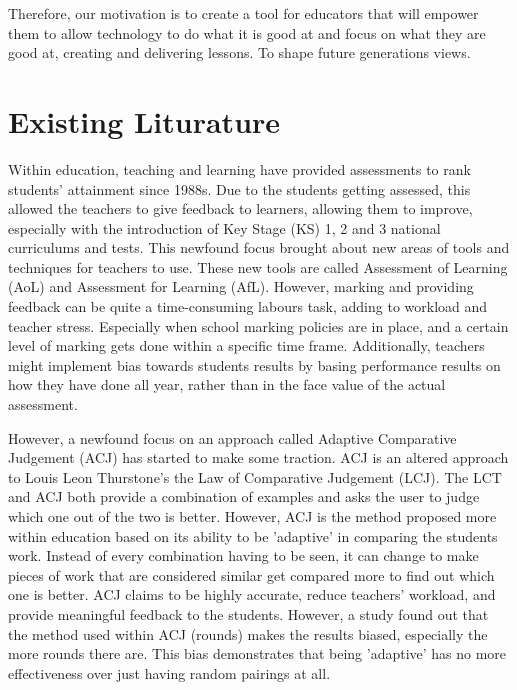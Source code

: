 	Therefore, our motivation is to create a tool for educators that will empower them to allow technology to do what it is good at and focus on what they are good at, creating and delivering lessons. To shape future generations views.




	\section{Existing Liturature}
	Within education, teaching and learning have provided assessments to rank students' attainment since 1988s. Due to the students getting assessed, this allowed the teachers to give feedback to learners, allowing them to improve, especially with the introduction of Key Stage (KS) 1, 2 and 3 national curriculums and tests. This newfound focus brought about new areas of tools and techniques for teachers to use. These new tools are called Assessment of Learning (AoL) and Assessment for Learning (AfL). However, marking and providing feedback can be quite a time-consuming labours task, adding to workload and teacher stress. Especially when school marking policies are in place, and a certain level of marking gets done within a specific time frame. Additionally, teachers might implement bias towards students results by basing performance results on how they have done all year, rather than in the face value of the actual assessment.
	
	However, a newfound focus on an approach called Adaptive Comparative Judgement (ACJ) has started to make some traction. ACJ is an altered approach to Louis Leon Thurstone's the Law of Comparative Judgement (LCJ). The LCT and ACJ both provide a combination of examples and asks the user to judge which one out of the two is better. However, ACJ is the method proposed more within education based on its ability to be 'adaptive' in comparing the students work. Instead of every combination having to be seen, it can change to make pieces of work that are considered similar get compared more to find out which one is better. ACJ  claims to be highly accurate, reduce teachers' workload, and provide meaningful feedback to the students. However, a study found out that the method used within ACJ (rounds) makes the results biased, especially the more rounds there are. This bias demonstrates that being 'adaptive' has no more effectiveness over just having random pairings at all.
	
